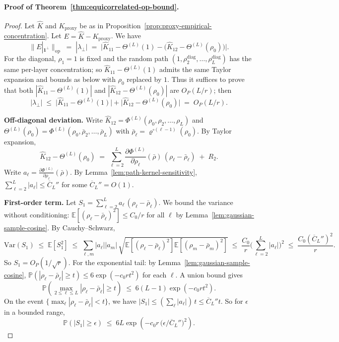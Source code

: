 \paragraph{Proof of Theorem~\ref{thm:equicorrelated-op-bound}.}
\begin{proof}
Let \(\hat{K}\) and \(K_{\mathrm{proxy}}\) be as in Proposition~\ref{prop:proxy-empirical-concentration}. Let \(E=\hat{K}-K_{\mathrm{proxy}}\). We have
\[
\|E|_{\mathbf{1}^\perp}\|_{\mathrm{op}} \;=\; |\lambda_\perp| \;=\; \bigl|\hat{K}_{11}-\Theta^{(L)}(1)-\bigl(\hat{K}_{12}-\Theta^{(L)}(\rho_0)\bigr)\bigr|.
\]
For the diagonal, \(\rho_1=1\) is fixed and the random path \((1,\rho_2^{\mathrm{diag}},\ldots,\rho_L^{\mathrm{diag}})\) has the same per-layer concentration; so \(\hat{K}_{11}-\Theta^{(L)}(1)\) admits the same Taylor expansion and bounds as below with \(\rho_0\) replaced by \(1\). Thus it suffices to prove that both \(|\hat{K}_{11}-\Theta^{(L)}(1)|\) and \(|\hat{K}_{12}-\Theta^{(L)}(\rho_0)|\) are \(O_P(L/r)\); then
\[
|\lambda_\perp| \;\le\; \bigl|\hat{K}_{11}-\Theta^{(L)}(1)\bigr| + \bigl|\hat{K}_{12}-\Theta^{(L)}(\rho_0)\bigr| \;=\; O_P(L/r).
\]

\medskip
\noindent\textbf{Off-diagonal deviation.} Write \(\hat{K}_{12}=\Phi^{(L)}(\rho_0,\rho_2,\ldots,\rho_L)\) and \(\Theta^{(L)}(\rho_0)=\Phi^{(L)}(\rho_0,\bar{\rho}_2,\ldots,\bar{\rho}_L)\) with \(\bar{\rho}_\ell=\varrho^{\circ(\ell-1)}(\rho_0)\). By Taylor expansion,
\[
\hat{K}_{12}-\Theta^{(L)}(\rho_0) \;=\; \sum_{\ell=2}^L \frac{\partial\Phi^{(L)}}{\partial\rho_\ell}(\bar{\rho})\,(\rho_\ell-\bar{\rho}_\ell) \;+\; R_2.
\]
Write \(a_\ell=\frac{\partial\Phi^{(L)}}{\partial\rho_\ell}(\bar{\rho})\). By Lemma~\ref{lem:path-kernel-sensitivity}, \(\sum_{\ell=2}^L |a_\ell|\le \overline{C}_L''\) for some \(\overline{C}_L''=O(1)\).

\medskip
\noindent\textbf{First-order term.} Let \(S_1=\sum_{\ell=2}^L a_\ell\,(\rho_\ell-\bar{\rho}_\ell)\). We bound the variance without conditioning: \(\mathbb{E}[(\rho_\ell-\bar{\rho}_\ell)^2]\le C_0/r\) for all \(\ell\) by Lemma~\ref{lem:gaussian-sample-cosine}. By Cauchy--Schwarz,
\[
\mathrm{Var}(S_1) \;\le\; \mathbb{E}[S_1^2] \;\le\; \sum_{\ell,m} |a_\ell||a_m|\,\sqrt{\mathbb{E}[(\rho_\ell-\bar{\rho}_\ell)^2]\mathbb{E}[(\rho_m-\bar{\rho}_m)^2]} \;\le\; \frac{C_0}{r}\biggl(\sum_{\ell=2}^L |a_\ell|\biggr)^{\!2} \;\le\; \frac{C_0(\overline{C}_L'')^2}{r}.
\]
So \(S_1=O_P(1/\sqrt{r})\). For the exponential tail: by Lemma~\ref{lem:gaussian-sample-cosine}, \(\mathbb{P}(|\rho_\ell-\bar{\rho}_\ell|\ge t)\le 6\exp(-c_0 r t^2)\) for each \(\ell\). A union bound gives
\[
\mathbb{P}\!\left(\max_{2\le \ell\le L}|\rho_\ell-\bar{\rho}_\ell|\ge t\right) \;\le\; 6(L-1)\exp(-c_0 r t^2).
\]
On the event \(\{\max_\ell|\rho_\ell-\bar{\rho}_\ell|< t\}\), we have \(|S_1|\le (\sum_\ell |a_\ell|)\,t\le \overline{C}_L'' t\). So for \(\epsilon\) in a bounded range,
\[
\mathbb{P}(|S_1|\ge \epsilon) \;\le\; 6L\exp\!\left(-c_0 r\,\bigl(\epsilon/\overline{C}_L''\bigr)^2\right).
\]


\end{proof}
